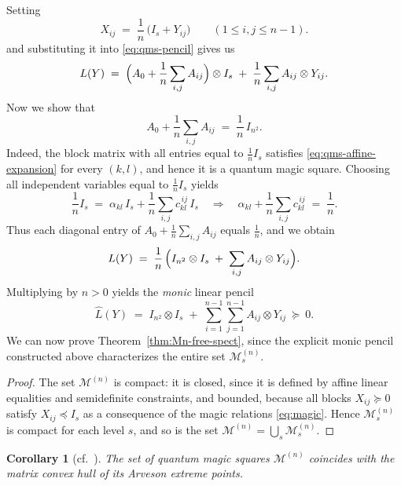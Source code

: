 \documentclass[11pt, a4paper]{article}
\theoremstyle{plain}
\newtheorem{corollary}[theorem]{Corollary}
\theoremstyle{definition}
\theoremstyle{remark}
\newcommand{\cM}{\mathcal{M}} \newcommand{\cN}{\mathcal{N}} \newcommand{\cO}{\mathcal{O}}
\begin{document}
Setting
\[
X_{ij}\;=\;\frac{1}{n}\,\bigl(I_s+Y_{ij}\bigr)\qquad(1\le i,j\le n-1).
\]
and substituting it into \eqref{eq:qms-pencil} gives us
\[
L(Y)\;=\;\Bigl(A_0+\frac{1}{n}\sum_{i,j}A_{ij}\Bigr)\otimes I_s
\;+\;\frac{1}{n}\sum_{i,j}A_{ij}\otimes Y_{ij}.
\]
Now we show that
\[
A_0+\frac{1}{n}\sum_{i,j}A_{ij}\;=\;\frac{1}{n}\,I_{n^2}.
\]
Indeed, the block matrix with all entries equal to \(\frac{1}{n}I_s\) satisfies \eqref{eq:qms-affine-expansion} for every \((k,l)\), and hence it is a quantum magic square. Choosing all independent variables equal to \(\frac{1}{n}I_s\) yields
\[
\frac{1}{n}I_s
\;=\;
\alpha_{kl}\,I_s+\frac{1}{n}\sum_{i,j}c_{kl}^{\,ij}\,I_s
\quad\Longrightarrow\quad
\alpha_{kl}+\frac{1}{n}\sum_{i,j}c_{kl}^{\,ij}\;=\;\frac{1}{n}.
\]
Thus each diagonal entry of \(A_0+\frac{1}{n}\sum_{i,j}A_{ij}\) equals \(\tfrac{1}{n}\), and we obtain
\[
L(Y)\;=\;\frac{1}{n}\,\Bigl(I_{n^2}\otimes I_s\;+\;\sum_{i,j}A_{ij}\otimes Y_{ij}\Bigr).
\]
Multiplying by \(n>0\) yields the \emph{monic} linear pencil
\[
\widehat L(Y)\;=\;I_{n^2}\otimes I_s\;+\;\sum_{i=1}^{n-1}\sum_{j=1}^{n-1} A_{ij}\otimes Y_{ij}\ \succeq\ 0.
\]
We can now prove Theorem~\ref{thm:Mn-free-spect}, since the explicit monic pencil constructed above characterizes the entire set \(\cM^{(n)}_s\).

\begin{proof}

The set \(\mathcal{M}^{(n)}\) is compact: it is closed, since it is defined by affine linear equalities and semidefinite
constraints, and bounded, because all blocks \(X_{ij}\succeq 0\) satisfy
\(X_{ij}\preceq I_s\) as a consequence of the magic relations
\eqref{eq:magic}.
Hence \(\mathcal{M}^{(n)}_s\) is compact for each level \(s\),
and so is the set \(\mathcal{M}^{(n)} = \bigcup_s \mathcal{M}^{(n)}_s\).
\end{proof} 

\begin{corollary}[cf.~\cite{DDN20}]
The set of quantum magic squares \(\mathcal{M}^{(n)}\) coincides with the matrix convex hull of its Arveson extreme points. 
\end{corollary}
\end{document}
